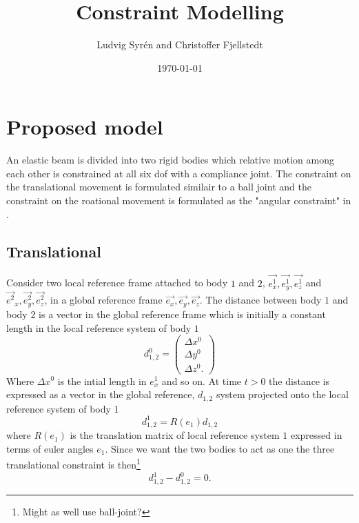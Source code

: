 \documentclass[letterpaper,12pt]{article}
\begin{document}
\title{Constraint Modelling}
\author{Ludvig Syrén and Christoffer Fjellstedt}
\date{\today}
\maketitle

\section{Proposed model}
An elastic beam is divided into two rigid bodies which relative motion among each
other is constrained at all six dof with a compliance joint. The constraint on 
the translational movement is formulated similair to a ball joint \cite{Erleben}
and the constraint on the roational movement is formulated as the 
"angular constraint" in \cite{IEEE}.

\subsection{Translational}
Consider two local reference frame attached to body $1$ and $2$, 
$\vec{e^1_x}, \vec{e^1_y}, \vec{e^1_z}$ and $\vec{e^2}_x, \vec{e^2_y}, \vec{e^2_z}$,
 in a global reference frame $\vec{e_x}, \vec{e_y}, \vec{e_z}$. The distance between
 body $1$ and body $2$ is a vector in the global reference frame which is initially a
 constant length in the local reference system of body $1$
 \begin{equation}
    d^0_{1,2}=
    \begin{pmatrix}
        \Delta x^0\\
        \Delta y^0\\
        \Delta z^0.
    \end{pmatrix} 
 \end{equation}
 Where $\Delta x^0$ is the intial length in $e^1_x$ and so on.
At time $t>0$ the distance is expressed as a vector in the global reference, $d_{1,2}$ system 
projected onto the local reference system of body $1$
\begin{equation}
    d^1_{1,2}=R(e_1)d_{1,2}
\end{equation}
where $R(e_1)$ is the translation matrix of local reference system $1$ expressed in terms
of euler angles $e_1$. Since we want the two bodies to act as one the three translational constraint
is then\footnote{Might as well use ball-joint?}
\begin{equation}
    d^1_{1,2}-d^0_{1,2}=0.
\end{equation}
\end{document}
